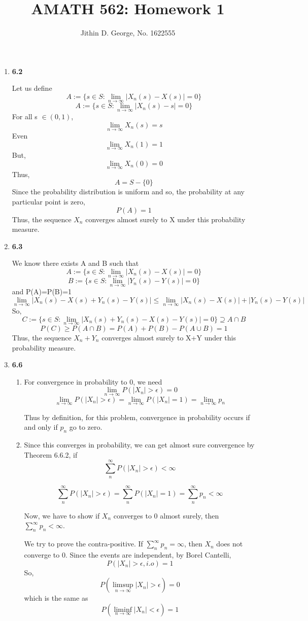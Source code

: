\documentclass[a4paper,11pt]{article}
\title{AMATH 562: Homework 1}
\author{Jithin D. George, No. 1622555}
\begin{document}
\maketitle
\begin{enumerate}

\item {\bf 6.2}

Let us define
\[A := \{s\in S : \lim_{n \to \infty} |X_n(s)-X(s)|=0\}\]
\[A := \{s\in S : \lim_{n \to \infty} |X_n(s)-s|=0\}\]
For all s $\in (0,1)$,
\[\lim_{n \to \infty} X_n(s) = s\]
Even 
\[\lim_{n \to \infty} X_n(1) = 1\]
But,
\[\lim_{n \to \infty} X_n(0) = 0\]
Thus,
\[A = S-\{0\}\]
Since the probability distribution is uniform and so, the probability at any particular point is zero,
\[P(A)=1\]
Thus, the sequence $X_n$ converges almost surely to X under this probability measure.

\item
{\bf 6.3} 

We know there exists A and B such that
\[A := \{s\in S : \lim_{n \to \infty} |X_n(s)-X(s)|=0\}\]
\[B := \{s\in S : \lim_{n \to \infty} |Y_n(s)-Y(s)|=0\}\]
and P(A)=P(B)=1
\[\lim_{n \to \infty} |X_n(s)-X(s)+ Y_n(s)-Y(s)|\leq\lim_{n \to \infty} |X_n(s)-X(s)|+|Y_n(s)-Y(s)| \]
So,
\[C := \{s\in S : \lim_{n \to \infty} |X_n(s)+Y_n(s)-X(s)-Y(s)|=0\} \supseteq A \cap B\]
\[P(C) \geq P(A\cap B) = P(A)+P(B)-P(A\cup B)=1\]
Thus, the sequence $X_n + Y_n$ converges almost surely to X+Y under this probability measure.
\item
{\bf 6.6}
\begin{enumerate}
\item
For convergence in probability to 0, we need
\[\lim_{n \to \infty} P(|X_n|>\epsilon)=0\]
\[\lim_{n \to \infty} P(|X_n|>\epsilon)=\lim_{n \to \infty} P(|X_n|=1)=\lim_{n \to \infty} p_n\]

Thus by definition, for this problem, convergence in probability occurs if and only if $p_n$ go to zero.
\item
Since this converges in probability, we can get almost sure convergence by Theorem 6.6.2, if 
\[\sum_{n}^{\infty} P(|X_n|>\epsilon) <\infty\]

\[\sum_{n}^{\infty}  P(|X_n|>\epsilon)= \sum_{n}^{\infty}  P(|X_n|=1)=\sum_{n}^{\infty}  p_n  <\infty\]

Now, we have to show if $X_n$ converges to 0 almost surely, then $\sum_{n}^{\infty}  p_n  <\infty$.

We try to prove the contra-positive.
If $\sum_{n}^{\infty}  p_n  = \infty$, then $X_n$ does not converge to 0.
Since the events are independent, by Borel Cantelli,
\[P(|X_n|>\epsilon,i.o)=1\]
So,
\[P(\limsup_{n \to \infty}|X_n|>\epsilon)=0\]
which is the same as 
\[P(\liminf_{n \to \infty}|X_n|<\epsilon)=1\]


\end{enumerate}
\end{enumerate}
\end{document}
